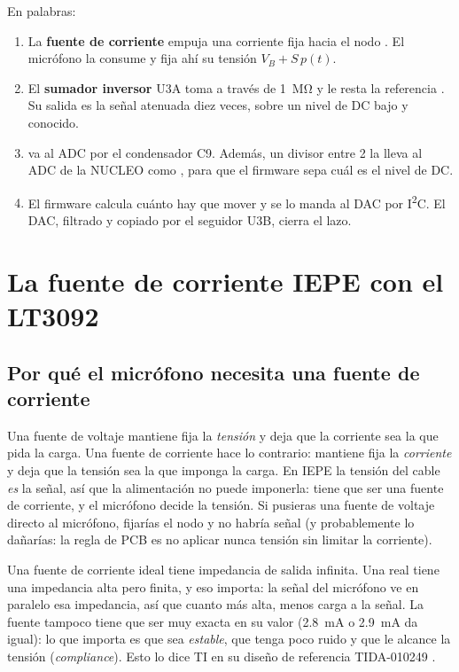 En palabras:
\begin{enumerate}
  \item La \textbf{fuente de corriente} empuja una corriente fija hacia el nodo . El micrófono la consume y
        fija ahí su tensión $V_B + S\,p(t)$.
  \item El \textbf{sumador inversor} U3A toma  a través de \SI{1}{\mega\ohm} y le resta la referencia
        . Su salida  es la señal atenuada diez veces, sobre un nivel de DC bajo y conocido.
  \item {} va al ADC por el condensador C9. Además, un divisor entre 2 la lleva al ADC de la NUCLEO como
        , para que el firmware sepa cuál es el nivel de DC.
  \item El firmware calcula cuánto hay que mover  y se lo manda al DAC por I\textsuperscript{2}C. El DAC,
        filtrado y copiado por el seguidor U3B, cierra el lazo.
\end{enumerate}

\section{La fuente de corriente IEPE con el LT3092}\label{sec:c03-fuente}

\subsection{Por qué el micrófono necesita una fuente de corriente}

\begin{idea}
Una fuente de voltaje mantiene fija la \emph{tensión} y deja que la corriente sea la que pida la carga. Una fuente de
corriente hace lo contrario: mantiene fija la \emph{corriente} y deja que la tensión sea la que imponga la carga. En
IEPE la tensión del cable \emph{es} la señal, así que la alimentación no puede imponerla: tiene que ser una fuente de
corriente, y el micrófono decide la tensión. Si pusieras una fuente de voltaje directo al micrófono, fijarías el nodo
y no habría señal (y probablemente lo dañarías: la regla de PCB es no aplicar nunca tensión sin limitar la corriente).
\end{idea}

Una fuente de corriente ideal tiene impedancia de salida infinita. Una real tiene una impedancia alta pero finita, y
eso importa: la señal del micrófono ve en paralelo esa impedancia, así que cuanto más alta, menos carga a la señal.
La fuente tampoco tiene que ser muy exacta en su valor (\SI{2.8}{\milli\ampere} o \SI{2.9}{\milli\ampere} da igual):
lo que importa es que sea \emph{estable}, que tenga poco ruido y que le alcance la tensión (\emph{compliance}). Esto lo
dice TI en su diseño de referencia TIDA-010249 \copia[AGENTS.md §4].

